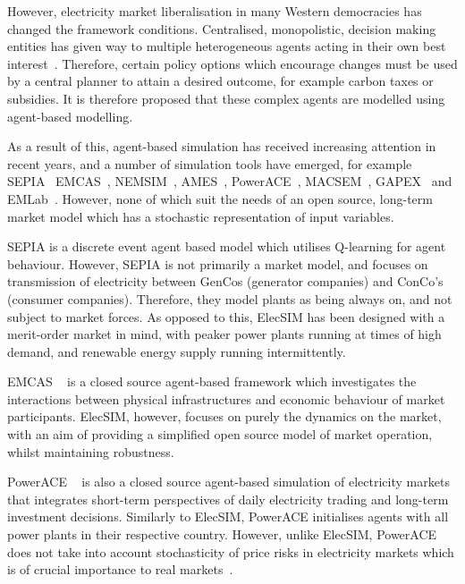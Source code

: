 However, electricity market liberalisation in many Western democracies has changed the framework conditions. Centralised, monopolistic, decision making entities has given way to multiple heterogeneous agents acting in their own best interest~\cite{Most2010}. Therefore, certain policy options which encourage changes must be used by a central planner to attain a desired outcome, for example carbon taxes or subsidies. It is therefore proposed that these complex agents are modelled using agent-based modelling.

As a result of this, agent-based simulation has received increasing attention in recent years, and a number of simulation tools have emerged, for example SEPIA~\cite{Kraan2018} EMCAS~\cite{Conzelmann}, NEMSIM~\cite{Batten2006}, AMES~\cite{Sun2007}, PowerACE~\cite{Rothengatter2007}, MACSEM~\cite{Praca2003}, GAPEX~\cite{Cincotti2013} and  EMLab~\cite{Chappin2017}. However, none of which suit the needs of an open source, long-term market model which has a stochastic representation of input variables.

SEPIA \cite{Harp2000} is a discrete event agent based model which utilises Q-learning for agent behaviour. However, SEPIA is not primarily a market model, and focuses on transmission of electricity between GenCos (generator companies) and ConCo's (consumer companies). Therefore, they model plants as being always on, and not subject to market forces. As opposed to this, ElecSIM has been designed with a merit-order market in mind, with peaker power plants running at times of high demand, and renewable energy supply running intermittently.

EMCAS ~\cite{Conzelmann} is a closed source agent-based framework which investigates the interactions between physical infrastructures and economic behaviour of market participants. ElecSIM, however, focuses on purely the dynamics on the market, with an aim of providing a simplified open source model of market operation, whilst maintaining robustness.

PowerACE ~\cite{Rothengatter2007} is also a closed source agent-based simulation of electricity markets that integrates short-term perspectives of daily electricity trading and long-term investment decisions. Similarly to ElecSIM, PowerACE initialises agents with all power plants in their respective country. However, unlike ElecSIM, PowerACE does not take into account stochasticity of price risks in electricity markets which is of crucial importance to real markets~\cite{Most2010}.

